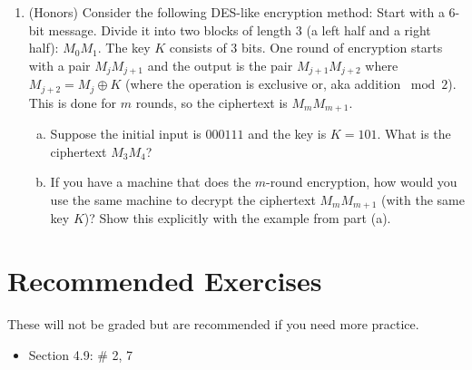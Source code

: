 \documentclass[12pt]{amsart}
\theoremstyle{plain}
\theoremstyle{definition}
\begin{document}
\begin{enumerate}[1.]
	\begin{framed}
	\vspace{2in}
	\end{framed}
	\newpage \item (Honors) Consider the following DES-like encryption method: Start with a 6-bit message.  Divide it into two blocks of length 3 (a left half and a right half): $M_0M_1$.  The key $K$ consists of 3 bits.  One round of encryption starts with a pair $M_jM_{j+1}$ and the output is the pair $M_{j+1}M_{j+2}$ where $M_{j+2} = M_j \oplus K$ (where the operation is exclusive or, aka addition $\bmod 2$).  This is done for $m$ rounds, so the ciphertext is $M_mM_{m+1}$.
	\begin{enumerate}[a.]
		\item Suppose the initial input is $000111$ and the key is $K = 101$.  What is the ciphertext $M_3M_4$?
		\begin{framed}
		\vspace{2in}
		\end{framed}
		\item If you have a machine that does the $m$-round encryption, how would you use the same machine to decrypt the ciphertext $M_{m}M_{m+1}$ (with the same key $K$)?  Show this explicitly with the example from part (a).
	\end{enumerate}
	\begin{framed}
	\vspace{2in}
	\end{framed}
\end{enumerate}
	

\section{Recommended Exercises}
\noindent These will not be graded but are recommended if you need more practice.
\begin{itemize}
	\item Section 4.9: \# 2, 7
\end{itemize}
	
\end{document}
